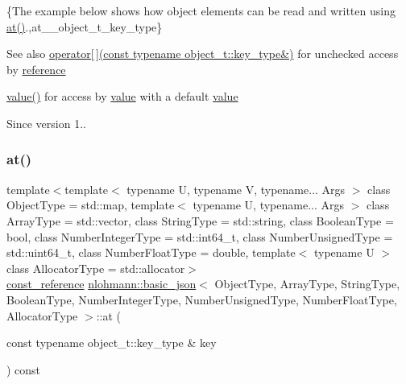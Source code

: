\{The example below shows how object elements can be read and written using {\ttfamily \hyperlink{classnlohmann_1_1basic__json_a214a8c22d616fd3567b88932c07436c9}{at()}}.,at\+\_\+\+\_\+object\+\_\+t\+\_\+key\+\_\+type\}

\begin{DoxySeeAlso}{See also}
\hyperlink{classnlohmann_1_1basic__json_a92fbb711a36b5ce78ee228b26787c034}{operator\mbox{[}$\,$\mbox{]}(const typename object\+\_\+t\+::key\+\_\+type\&)} for unchecked access by \hyperlink{classnlohmann_1_1basic__json_a3ec8e17be8732fe436e9d6733f52b7a3}{reference} 

\hyperlink{classnlohmann_1_1basic__json_a407e73a037e6e3067ef7aa2c25a79f39}{value()} for access by \hyperlink{classnlohmann_1_1basic__json_a407e73a037e6e3067ef7aa2c25a79f39}{value} with a default \hyperlink{classnlohmann_1_1basic__json_a407e73a037e6e3067ef7aa2c25a79f39}{value}
\end{DoxySeeAlso}
\begin{DoxySince}{Since}
version 1.. 
\end{DoxySince}
\hypertarget{classnlohmann_1_1basic__json_a2ec9378f9545adf4b79099aa8f8a1673}{}\label{classnlohmann_1_1basic__json_a2ec9378f9545adf4b79099aa8f8a1673} 
\subsubsection{\texorpdfstring{at()}{at()}\hspace{0.1cm}{\footnotesize\ttfamily [4/6]}}
{\footnotesize\ttfamily template$<$template$<$ typename U, typename V, typename... Args $>$ class Object\+Type = std\+::map, template$<$ typename U, typename... Args $>$ class Array\+Type = std\+::vector, class String\+Type  = std\+::string, class Boolean\+Type  = bool, class Number\+Integer\+Type  = std\+::int64\+\_\+t, class Number\+Unsigned\+Type  = std\+::uint64\+\_\+t, class Number\+Float\+Type  = double, template$<$ typename U $>$ class Allocator\+Type = std\+::allocator$>$ \\
\hyperlink{classnlohmann_1_1basic__json_af677a29b0e66edc9f66e5167e4667071}{const\+\_\+reference} \hyperlink{classnlohmann_1_1basic__json}{nlohmann\+::basic\+\_\+json}$<$ Object\+Type, Array\+Type, String\+Type, Boolean\+Type, Number\+Integer\+Type, Number\+Unsigned\+Type, Number\+Float\+Type, Allocator\+Type $>$\+::at (\begin{DoxyParamCaption}\item[{const typename object\+\_\+t\+::key\+\_\+type \&}]{key }\end{DoxyParamCaption}) const\hspace{0.3cm}{\ttfamily [inline]}}



